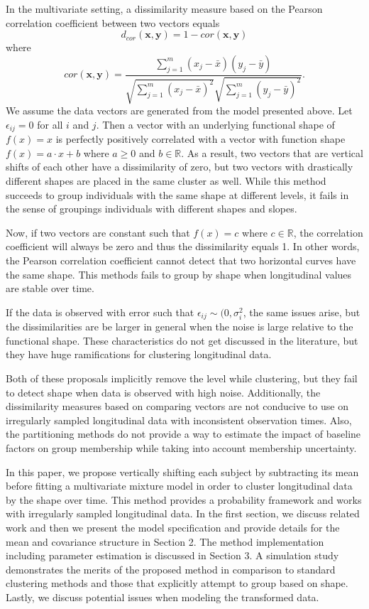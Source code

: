 \documentclass[12pt]{article}
\newcommand{\B}[0]{\mathbf}
\begin{document}
In the multivariate setting, a dissimilarity measure based on the Pearson correlation coefficient between two vectors equals 
$$d_{cor}(\B x,\B y) = 1-cor(\B x,\B y)$$ 
where $$cor(\B x,\B y) = \frac{\sum^{m}_{j=1}(x_{j}-\bar{x})(y_{j}-\bar{y})}{\sqrt{\sum^{m}_{j=1}(x_{j}-\bar{x})^{2}}\sqrt{\sum^{m}_{j=1}(y_{j}-\bar{y})^{2}}}.$$
We assume the data vectors are generated from the model presented above. Let $\epsilon_{ij}=0$ for all $i$ and $j$. Then a vector with an underlying functional shape of $f(x)=x$ is perfectly positively correlated with a vector with function shape $f(x)=a\cdot x + b$ where $a\geq0$ and $b\in\mathbb{R}$. As a result, two vectors that are vertical shifts of each other have a dissimilarity of zero, but two vectors with drastically different shapes are placed in the same cluster as well. While this method succeeds to group individuals with the same shape at different levels, it fails in the sense of groupings individuals with different shapes and slopes. 

Now, if two vectors are constant such that $f(x)=c$ where $c\in\mathbb{R}$,  the correlation coefficient will always be zero and thus the dissimilarity equals 1. In other words, the Pearson correlation coefficient cannot detect that two horizontal curves have the same shape. This methods fails to group by shape when longitudinal values are stable over time. 

If the data is observed with error such that $\epsilon_{ij}\sim(0,\sigma_{i}^{2}$, the same issues arise, but the dissimilarities are be larger in general when the noise is large relative to the functional shape. These characteristics do not get discussed in the literature, but they have huge ramifications for clustering longitudinal data.

Both of these proposals implicitly remove the level while clustering, but they fail to detect shape when data is observed with high noise. Additionally, the dissimilarity measures based on comparing vectors are not conducive to use on irregularly sampled longitudinal data with inconsistent observation times. Also, the partitioning methods do not provide a way to estimate the impact of baseline factors on group membership while taking into account membership uncertainty.  

In this paper, we propose vertically shifting each subject by subtracting its mean before fitting a multivariate mixture model in order to cluster longitudinal data by the shape over time. This method provides a probability framework and works with irregularly sampled longitudinal data. In the first section, we discuss related work and then we present the model specification and provide details for the mean and covariance structure in Section 2. The method implementation including parameter estimation is discussed in Section 3. A simulation study demonstrates the merits of the proposed method in comparison to standard clustering methods and those that explicitly attempt to group based on shape. Lastly, we discuss potential issues when modeling the transformed data.
\end{document}
